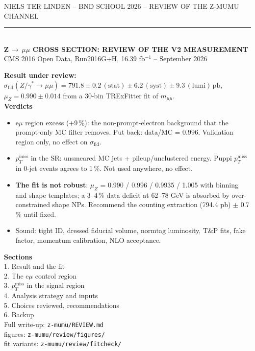 \documentclass[aspectratio=169,9pt,t]{beamer}
\newcommand{\pb}{\,\mathrm{pb}}
\newcommand{\muZ}{\mu_{Z}}
\newcommand{\met}{p_{T}^{\mathrm{miss}}}
\newcommand{\sfid}{\sigma_{\mathrm{fid}}}
\begin{document}
\begin{frame}[plain]
  \vspace{0.3cm}
  {\color{muted}\footnotesize\MakeTextUppercase{Niels ter Linden \;--\; BND school 2026 \;--\; review of the z-mumu channel}}\\[0.15cm]
  {\color{rule}\rule{\textwidth}{0.5pt}}\\[0.35cm]
  {\color{primary}\bfseries\LARGE\MakeTextUppercase{Z$\,\to\,\mu\mu$ cross section: review of the v2 measurement}}\\[0.25cm]
  {\color{body}\normalsize CMS 2016 Open Data, Run2016G+H, 16.39 fb$^{-1}$ \;-- September 2026}\\[0.3cm]
  \begin{minipage}[t]{0.58\textwidth}\footnotesize
    \textbf{Result under review:} $\sfid(Z/\gamma^*\!\to\mu\mu) = 791.8 \pm 0.2\,(\mathrm{stat}) \pm 6.2\,(\mathrm{syst}) \pm 9.3\,(\mathrm{lumi})\pb$, $\muZ = 0.990 \pm 0.014$ from a 30-bin TRExFitter fit of $m_{\mu\mu}$.\\[0.25cm]
    \textbf{Verdicts}
    \begin{itemize}\setlength\itemsep{0.1em}
      \item e$\mu$ region excess (+9\,\%): the non-prompt-electron background that the prompt-only MC filter removes. Put back: data/MC = 0.996. Validation region only, no effect on $\sfid$.
      \item $\met$ in the SR: unsmeared MC jets + pileup/unclustered energy. Puppi $\met$ in 0-jet events agrees to 1\,\%. Not used anywhere, no effect.
      \item \textbf{The fit is not robust}: $\muZ$ = 0.990 / 0.996 / 0.9935 / 1.005 with binning and shape templates; a 3--4\,\% data deficit at 62--78 GeV is absorbed by over-constrained shape NPs. Recommend the counting extraction (794.4 pb) $\pm$ 0.7\,\% until fixed.
      \item Sound: tight ID, dressed fiducial volume, normtag luminosity, T\&P fits, fake factor, momentum calibration, NLO acceptance.
    \end{itemize}
  \end{minipage}\hfill
  \begin{minipage}[t]{0.36\textwidth}\footnotesize\color{muted}
    \textbf{\color{body}Sections}\\[0.1cm]
    1.\; Result and the fit\\
    2.\; The e$\mu$ control region\\
    3.\; $\met$ in the signal region\\
    4.\; Analysis strategy and inputs\\
    5.\; Choices reviewed, recommendations\\
    6.\; Backup\\[0.3cm]
    {\footnotesize Full write-up: \texttt{z-mumu/REVIEW.md}\\ figures: \texttt{z-mumu/review/figures/}\\ fit variants: \texttt{z-mumu/review/fitcheck/}}
  \end{minipage}
\end{frame}
\end{document}
